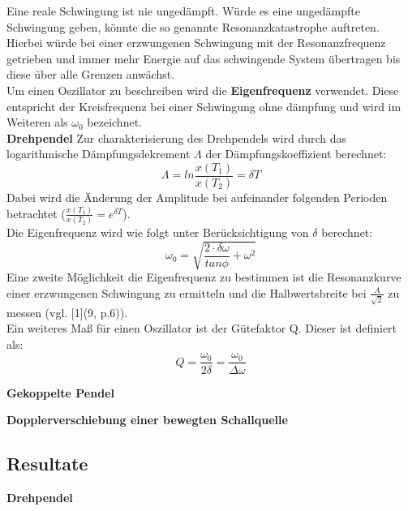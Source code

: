 \documentclass[12pt,a4paper]{article}
\begin{document}
\begin{multicols}{2}
Eine reale Schwingung ist nie ungedämpft. Würde es eine ungedämpfte Schwingung geben, könnte die so genannte Resonanzkatastrophe auftreten. Hierbei würde bei einer erzwungenen Schwingung mit der Resonanzfrequenz getrieben und immer mehr Energie auf das schwingende System übertragen bis diese über alle Grenzen anwächst.\\
Um einen Oszillator zu beschreiben wird die \textbf{Eigenfrequenz} verwendet. Diese entspricht der Kreisfrequenz bei einer Schwingung ohne dämpfung und wird im Weiteren als $\omega_0$ bezeichnet.\\

\textbf{Drehpendel}
Zur charakterisierung des Drehpendels wird durch das logarithmische Dämpfungsdekrement $\Lambda$ der Dämpfungskoeffizient berechnet:
$$\Lambda = ln \frac{x(T_1)}{x(T_2)} = \delta T$$
Dabei wird die Änderung der Amplitude bei aufeinander folgenden Perioden betrachtet ($\frac{x(T_1)}{x(T_2)} = e^{\delta T}$).\\
Die Eigenfrequenz wird wie folgt unter Berücksichtigung von $\delta$ berechnet:
$$ \omega_0 = \sqrt{\frac{2\cdot \delta \omega}{tan \phi} + \omega^2 }$$
Eine zweite Möglichkeit die Eigenfrequenz zu bestimmen ist die Resonanzkurve einer erzwungenen Schwingung zu ermitteln und die Halbwertsbreite bei $\frac{A}{\sqrt{2}}$ zu messen (vgl. [1](9, p.6)).\\
Ein weiteres Maß für einen Oszillator ist der Gütefaktor Q. Dieser ist definiert als:
$$Q = \frac{\omega_0}{2\delta} = \frac{\omega_0}{\Delta \omega}$$

\textbf{Gekoppelte Pendel}

\textbf{Dopplerverschiebung einer bewegten Schallquelle}

\pagebreak
\subsection{Resultate}
\textbf{Drehpendel}


\end{multicols}
\end{document}
